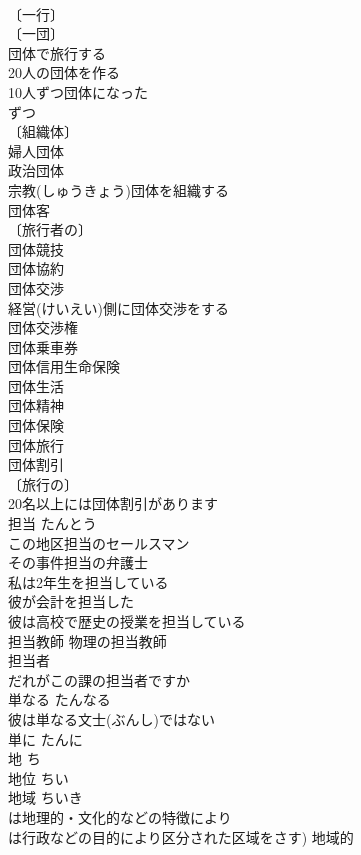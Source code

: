 \documentclass[8pt]{extreport}
\begin{document}
\begin{CJK}{UTF8}{min}
\\	〔一行〕
\\	〔一団〕
\\	団体で旅行する 
\\	20人の団体を作る 
\\	10人ずつ団体になった 
\\	ずつ　
\\	〔組織体〕
\\	婦人団体 
\\	政治団体 
\\	宗教(しゅうきょう)団体を組織する 
\\	団体客 
\\	〔旅行者の〕
\\	団体競技 
\\	団体協約 
\\	団体交渉 
\\	経営(けいえい)側に団体交渉をする 
\\	団体交渉権 
\\	団体乗車券 
\\	団体信用生命保険 
\\	団体生活 
\\	団体精神 
\\	団体保険 
\\	団体旅行 
\\	団体割引 
\\	〔旅行の〕
\\	20名以上には団体割引があります 
\\	担当	たんとう	
\\	この地区担当のセールスマン 
\\	その事件担当の弁護士 
\\	私は2年生を担当している 
\\	彼が会計を担当した 
\\	彼は高校で歴史の授業を担当している 
\\	担当教師 物理の担当教師 
\\	担当者 
\\	だれがこの課の担当者ですか 
\\	単なる	たんなる	
\\	彼は単なる文士(ぶんし)ではない 
\\	単に	たんに	
\\	地	ち	
\\	地位	ちい	
\\	地域	ちいき	
\\	は地理的・文化的などの特徴により
\\	は行政などの目的により区分された区域をさす) 地域的 

\end{CJK}
\end{document}
